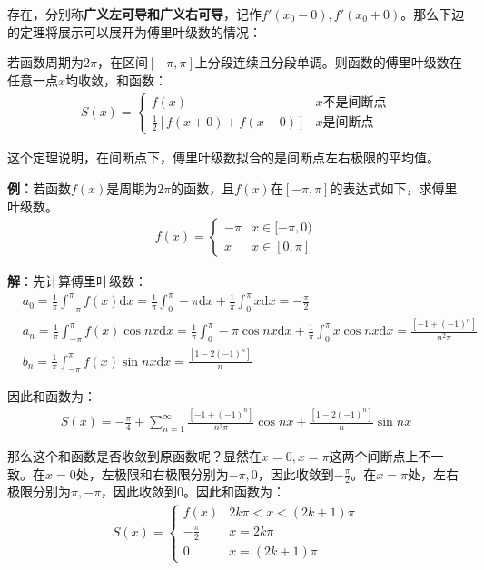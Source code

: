 \documentclass{ctexart}
\let\oldtextbf\textbf
\renewcommand{\textbf}[1]{\textcolor{brown!50!red}{\oldtextbf{#1}}}
\begin{document}
存在，分别称\textbf{\color{brown!50!red}广义左可导和广义右可导}，记作$f'(x_0-0),f'(x_0+0)$。那么下边的定理将展示可以展开为傅里叶级数的情况：
\begin{tcolorbox}[
    colback=bac2,     %
    colframe=fra2,   %
    coltitle=white,             %
    coltext=tex2,
    title=狄利克雷定理,
    fonttitle=\bfseries,        %
arc=3mm,                     %
breakable
]
若函数周期为$2\pi$，在区间$[-\pi,\pi]$上分段连续且分段单调。则函数的傅里叶级数在任意一点$x$均收敛，和函数：
\begin{align*}
    S(x)=\begin{cases}
        f(x)  &x\text{不是间断点}\\
        \frac{1}{2}[f(x+0)+f(x-0)] &x\text{是间断点}
    \end{cases}
\end{align*}
\end{tcolorbox}

这个定理说明，在间断点下，傅里叶级数拟合的是间断点左右极限的平均值。

\textbf{\color{brown!50!red}例：}若函数$f(x)$是周期为$2\pi$的函数，且$f(x)$在$[-\pi,\pi]$的表达式如下，求傅里叶级数。
\begin{align*}
    f(x)=\begin{cases}
        -\pi &x\in[-\pi,0)\\
        x  &x\in[0,\pi]
    \end{cases}
\end{align*}

\textbf{\color{brown!50!red}解}：先计算傅里叶级数：
\begin{align*}
&a_0=\frac{1}{\pi}\int_{-\pi}^\pi f(x)\mathrm{d}x=\frac{1}{\pi}
\int_0^\pi -\pi \mathrm{d}x+\frac{1}{\pi}\int_0^\pi x\mathrm{d}x =-\frac{\pi}{2} \\
&a_n=\frac{1}{\pi}\int_{-\pi}^\pi f(x)\cos nx\mathrm{d}x=
\frac{1}{\pi}
\int_0^\pi -\pi\cos nx \mathrm{d}x+\frac{1}{\pi}\int_0^\pi x\cos n x\mathrm{d}x=\frac{[-1+(-1)^n]}{n^2\pi}\\
&b_n=\frac{1}{\pi} \int_{-\pi}^\pi f(x)\sin nx \mathrm{d}x=\frac{[1-2(-1)^n]}{n}
\end{align*}

因此和函数为：
\begin{align*}
    S(x)=-\frac{\pi}{4}+\sum_{n=1}^\infty  \frac{[-1+(-1)^n]}{n^2\pi}\cos nx+\frac{[1-2(-1)^n]}{n}\sin nx
\end{align*}

那么这个和函数是否收敛到原函数呢？显然在$x=0,x=\pi$这两个间断点上不一致。在$x=0$处，左极限和右极限分别为$-\pi,0$，因此收敛到$-\frac{\pi}{2}$。在$x=\pi$处，左右极限分别为$\pi,-\pi$，因此收敛到$0$。因此和函数为：
\begin{align*}
    S(x)=\begin{cases}
        f(x) & 2k\pi<x<(2k+1)\pi\\
        -\frac{\pi}{2} &x=2k\pi\\
        0 &x=(2k+1)\pi
    \end{cases}
\end{align*}
\end{document}
